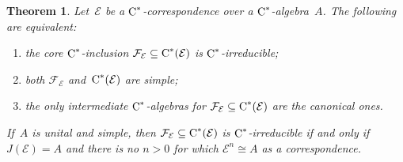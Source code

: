 \documentclass[a4paper]{amsart}
\theoremstyle{plain}
\newtheorem{theorem}{Theorem}
\theoremstyle{definition}
\theoremstyle{remark}
\numberwithin{theorem}{section}
\numberwithin{equation}{section}
\newcommand*{\nb}{\nobreakdash}
\newcommand*{\Cst}{\textup C^*}%
\newcommand*{\Hilm}[1][E]{\mathcal #1}%
\begin{document}
\begin{theorem}
  \label{thm:irreducible_from_Cuntz_Pimsner}
  Let~\(\Hilm\) be a \(\Cst\)\nb-correspondence over a
  \(\Cst\)\nb-algebra~\(A\).
  The following are equivalent:
  \begin{enumerate}
  \item \label{enu:irreducible_from_Cuntz_Pimsner1}%
    the core \(\Cst\)\nb-inclusion \(\Hilm[F]_{\Hilm}\subseteq
    \Cst(\Hilm)\) is \(\Cst\)\nb-irreducible;
  \item \label{enu:irreducible_from_Cuntz_Pimsner2}%
    both \(\Hilm[F]_{\Hilm}\) and~\(\Cst(\Hilm)\) are simple;
  \item \label{cor:irreducible_from_Cuntz_Pimsner3}%
    the only intermediate \(\Cst\)\nb-algebras for
    \(\Hilm[F]_{\Hilm}\subseteq \Cst(\Hilm)\) are the canonical ones.
  \end{enumerate}
  If~\(A\) is unital and simple, then \(\Hilm[F]_{\Hilm}\subseteq
  \Cst(\Hilm)\) is \(\Cst\)\nb-irreducible if and only if
  \(J(\Hilm)=A\)  and there is no \(n>0\) for which \(\Hilm^n\cong A\)
  as a correspondence.
\end{theorem}
\end{document}
